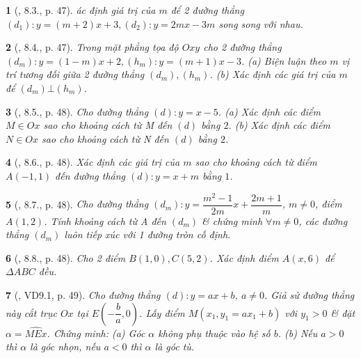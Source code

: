 \documentclass{article}
\newtheorem{baitoan}{}
\begin{document}
\begin{baitoan}[\cite{TLCT_THCS_Toan_9_dai_so}, 8.3., p. 47]
	ác định giá trị của $m$ để 2 đường thẳng $(d_1):y = (m + 2)x + 3,(d_2):y = 2mx - 3m$ song song với nhau.
\end{baitoan}

\begin{baitoan}[\cite{TLCT_THCS_Toan_9_dai_so}, 8.4., p. 47]
	Trong mặt phẳng tọa độ $Oxy$ cho 2 đường thẳng $(d_m):y = (1 - m)x + 2,(h_m):y = (m + 1)x - 3$. (a) Biện luận theo $m$ vị trí tương đối giữa 2 đường thẳng $(d_m),(h_m)$. (b) Xác định các giá trị của $m$ để $(d_m)\bot(h_m)$.
\end{baitoan}

\begin{baitoan}[\cite{TLCT_THCS_Toan_9_dai_so}, 8.5., p. 48]
	Cho đường thẳng $(d):y = x - 5$. (a) Xác định các điểm $M\in Ox$ sao cho khoảng cách từ M đến $(d)$ bằng $2$. (b) Xác định các điểm $N\in Ox$ sao cho khoảng cách từ N đến $(d)$ bằng $2$.
\end{baitoan}

\begin{baitoan}[\cite{TLCT_THCS_Toan_9_dai_so}, 8.6., p. 48]
	Xác định các giá trị của $m$ sao cho khoảng cách từ điểm $A(-1,1)$ đến đường thẳng $(d):y = x + m$ bằng $1$.
\end{baitoan}

\begin{baitoan}[\cite{TLCT_THCS_Toan_9_dai_so}, 8.7., p. 48]
	Cho đường thẳng $(d_m):y = \dfrac{m^2 - 1}{2m}x + \dfrac{2m + 1}{m}$, $m\ne0$, điểm $A(1,2)$. Tính khoảng cách từ A đến $(d_m)$ \& chứng minh $\forall m\ne0$, các đường thẳng $(d_m)$ luôn tiếp xúc với 1 đường tròn cố định.
\end{baitoan}

\begin{baitoan}[\cite{TLCT_THCS_Toan_9_dai_so}, 8.8., p. 48]
	Cho 2 điểm $B(1,0),C(5,2)$. Xác định điểm $A(x,6)$ để $\Delta ABC$ đều.
\end{baitoan}

\begin{baitoan}[\cite{TLCT_THCS_Toan_9_dai_so}, VD9.1, p. 49]
	Cho đường thẳng $(d):y = ax + b$, $a\ne0$. Giả sử đường thẳng này cắt trục $Ox$ tại $E\left(-\dfrac{b}{a},0\right)$. Lấy điểm $M(x_1,y_1 = ax_1 + b)$ với $y_1 > 0$ \& đặt $\alpha = \widehat{MEx}$. Chứng minh: (a) Góc $\alpha$ không phụ thuộc vào hệ số $b$. (b) Nếu $a > 0$ thì $\alpha$ là góc nhọn, nếu $a < 0$ thì $\alpha$ là góc tù.
\end{baitoan}
\end{document}
